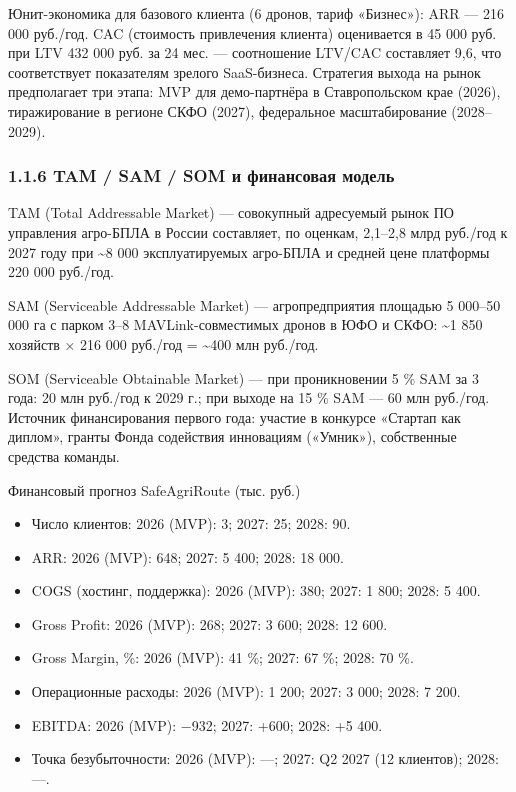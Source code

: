 \documentclass[14pt,a4paper]{extarticle}
\begin{document}
Юнит-экономика для базового клиента (6 дронов, тариф «Бизнес»): ARR --- 216 000 руб./год. CAC (стоимость привлечения клиента) оценивается в 45 000 руб. при LTV 432 000 руб. за 24 мес. --- соотношение LTV/CAC составляет 9,6, что соответствует показателям зрелого SaaS-бизнеса. Стратегия выхода на рынок предполагает три этапа: MVP для демо-партнёра в Ставропольском крае (2026), тиражирование в регионе СКФО (2027), федеральное масштабирование (2028--2029).

\hypertarget{tam-sam-som-ux438-ux444ux438ux43dux430ux43dux441ux43eux432ux430ux44f-ux43cux43eux434ux435ux43bux44c}{%
\subsubsection{1.1.6 TAM / SAM / SOM и финансовая модель}\label{tam-sam-som-ux438-ux444ux438ux43dux430ux43dux441ux43eux432ux430ux44f-ux43cux43eux434ux435ux43bux44c}}

TAM (Total Addressable Market) --- совокупный адресуемый рынок ПО управления агро-БПЛА в России составляет, по оценкам, 2,1--2,8 млрд руб./год к 2027 году при \textasciitilde8 000 эксплуатируемых агро-БПЛА и средней цене платформы 220 000 руб./год.

SAM (Serviceable Addressable Market) --- агропредприятия площадью 5 000--50 000 га с парком 3--8 MAVLink-совместимых дронов в ЮФО и СКФО: \textasciitilde1 850 хозяйств × 216 000 руб./год = \textasciitilde400 млн руб./год.

SOM (Serviceable Obtainable Market) --- при проникновении 5 \% SAM за 3 года: 20 млн руб./год к 2029 г.; при выходе на 15 \% SAM --- 60 млн руб./год. Источник финансирования первого года: участие в конкурсе «Стартап как диплом», гранты Фонда содействия инновациям («Умник»), собственные средства команды.

Финансовый прогноз SafeAgriRoute (тыс. руб.)
\begin{itemize}
\item Число клиентов: 2026 (MVP): 3; 2027: 25; 2028: 90.
\item ARR: 2026 (MVP): 648; 2027: 5 400; 2028: 18 000.
\item COGS (хостинг, поддержка): 2026 (MVP): 380; 2027: 1 800; 2028: 5 400.
\item Gross Profit: 2026 (MVP): 268; 2027: 3 600; 2028: 12 600.
\item Gross Margin, \%: 2026 (MVP): 41 \%; 2027: 67 \%; 2028: 70 \%.
\item Операционные расходы: 2026 (MVP): 1 200; 2027: 3 000; 2028: 7 200.
\item EBITDA: 2026 (MVP): −932; 2027: +600; 2028: +5 400.
\item Точка безубыточности: 2026 (MVP): —; 2027: Q2 2027 (12 клиентов); 2028: —.
\end{itemize}
\end{document}
